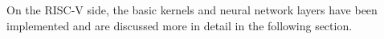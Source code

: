 On the RISC-V side, the basic kernels and neural network layers have been implemented and are discussed more in detail in the following section.
    
   


